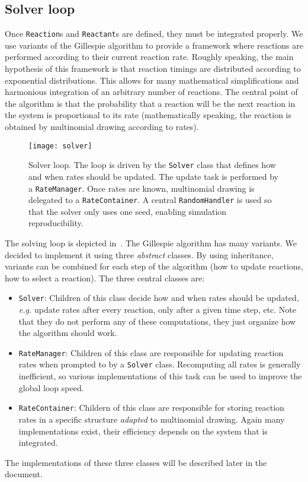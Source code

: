 
\subsection{Solver loop}

Once \texttt{Reaction}s and \texttt{Reactant}s are defined, they must be integrated properly. We use variants of the Gillespie algorithm to provide a framework where reactions are performed according to their current reaction rate. Roughly speaking, the main hypothesis of this framework is that reaction timings are distributed according to exponential distributions. This allows for many mathematical simplifications and harmonious integration of an arbitrary number of reactions. The central point of the algorithm is that the probability that a reaction will be the next reaction in the system is proportional to its rate (mathematically speaking, the reaction is obtained by multinomial drawing according to rates).

\begin{figure}[!h]
  \centering
  \texttt{[image: solver]}
  \caption{Solver loop. The loop is driven by the \texttt{Solver} class that defines how and when rates should be updated. The update task is performed by a \texttt{RateManager}. Once rates are known, multinomial drawing is delegated to a \texttt{RateContainer}. A central \texttt{RandomHandler} is used so that the solver only uses one seed, enabling simulation reproducibility.}
  \label{fig:solver}
\end{figure}

The solving loop is depicted in~. The Gillespie algorithm has many variants. We decided to implement it using three \emph{abstract} classes. By using inheritance, variants can be combined for each step of the algorithm (how to update reactions, how to select a reaction). The three central classes are:
\begin{itemize}
  \item \texttt{Solver}: Children of this class decide how and when rates should be updated, \textit{e.g.} update rates after every reaction, only after a given time step, etc. Note that they do not perform any of these computations, they just organize how the algorithm should work.
  \item \texttt{RateManager}: Children of this class are responsible for updating reaction rates when prompted to by a \texttt{Solver} class. Recomputing all rates is generally inefficient, so various implementations of this task can be used to improve the global loop speed.
  \item \texttt{RateContainer}: Childern of this class are responsible for storing reaction rates in a specific structure \emph{adapted} to multinomial drawing. Again many implementations exist, their efficiency depends on the system that is integrated.
\end{itemize}
The implementations of these three classes will be described later in the document.


